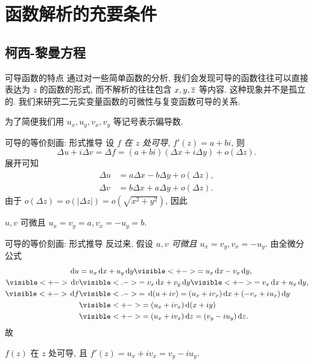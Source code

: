 \section{函数解析的充要条件}

\subsection{柯西-黎曼方程}
\begin{frame}{可导函数的特点}
	\onslide<+->
	通过对一些简单函数的分析, 我们会发现可导的函数往往可以直接表达为 $z$ 的函数的形式, 而不解析的往往包含 $x,y,\overline z$ 等内容.
	\onslide<+->
	这种现象并不是孤立的.
	\onslide<+->
	我们来研究二元实变量函数的可微性与复变函数可导的关系.

	\onslide<+->
	为了简便我们用 $u_x,u_y,v_x,v_y$ 等记号表示偏导数.
\end{frame}


\begin{frame}{可导的等价刻画: 形式推导}
	\onslide<+->
	设 \emph{$f$ 在 $z$ 处可导}, $f'(z)=a+bi$,
	\onslide<+->
	则
	\[\Delta u+i\Delta v=\Delta f=(a+bi)(\Delta x+i\Delta y)+o(\Delta z).\]
	\onslide<+->展开可知
	\begin{align*}
		\Delta u&=a\Delta x-b\Delta y+o(\Delta z),\\
		\Delta v&=b\Delta x+a\Delta y+o(\Delta z).
	\end{align*}
	\onslide<+->
	由于 $o(\Delta z)=o(|\Delta z|)=o(\sqrt{x^2+y^2})$,
	\onslide<+->因此 
	\begin{block@}
		\begin{center}
			$u,v$ 可微且 $u_x=v_y=a,v_x=-u_y=b$.
		\end{center}
	\end{block@}
\end{frame}


\begin{frame}{可导的等价刻画: 形式推导}
	\onslide<+->
	反过来, 假设 \emph{$u,v$ 可微且 $u_x=v_y, v_x=-u_y$}.
	\onslide<+->
	由全微分公式
	\begin{align*}
		\diff u&=u_x\diff x+u_y\diff y
		\visible<+->{=u_x\diff x-v_x\diff y,}\\
		\visible<+->{\diff v}&\visible<.->{=v_x\diff x+v_y\diff y}\visible<+->{=v_x\diff x+u_x\diff y,}\\
		\visible<+->{\diff f}&
		\visible<.->{=\diff (u+iv)=(u_x+i v_x)\diff x+(-v_x+i u_x)\diff y}\\
		&\visible<+->{=(u_x+i v_x)\diff(x+iy)}\\
		&\visible<+->{=(u_x+i v_x)\diff z=(v_y-i u_y)\diff z.}
	\end{align*}
	\onslide<+->
	故
	\begin{block@}
		\begin{center}
			$f(z)$ 在 $z$ 处可导, 且 $f'(z)=u_x+i v_x=v_y-i u_y$.
		\end{center}
	\end{block@}
\end{frame}


